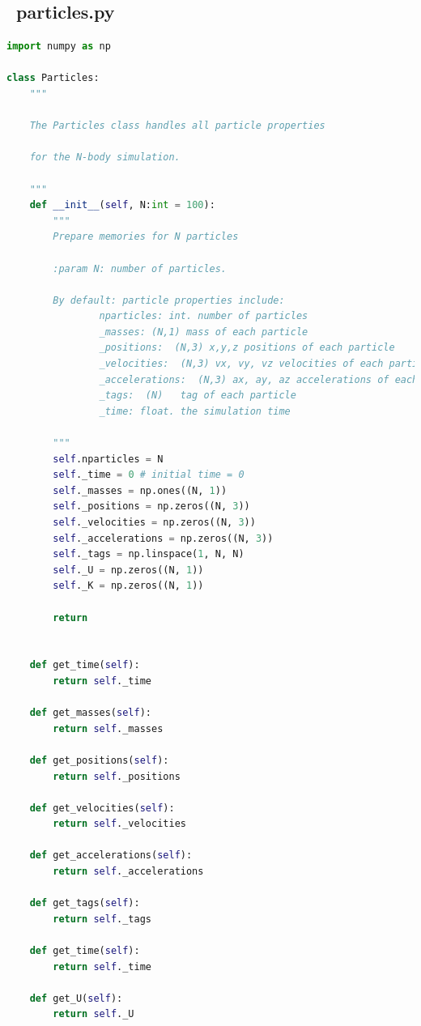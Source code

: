 \documentclass[12pt]{article}
\begin{document}
    \subsection{{\ttfamily\ particles.py}}
        \begin{lstlisting}[language={Python}]
import numpy as np

class Particles:
    """
    
    The Particles class handles all particle properties

    for the N-body simulation. 

    """
    def __init__(self, N:int = 100):
        """
        Prepare memories for N particles

        :param N: number of particles.

        By default: particle properties include:
                nparticles: int. number of particles
                _masses: (N,1) mass of each particle
                _positions:  (N,3) x,y,z positions of each particle
                _velocities:  (N,3) vx, vy, vz velocities of each particle
                _accelerations:  (N,3) ax, ay, az accelerations of each partciel
                _tags:  (N)   tag of each particle
                _time: float. the simulation time 

        """
        self.nparticles = N
        self._time = 0 # initial time = 0
        self._masses = np.ones((N, 1))
        self._positions = np.zeros((N, 3))
        self._velocities = np.zeros((N, 3))
        self._accelerations = np.zeros((N, 3))
        self._tags = np.linspace(1, N, N)
        self._U = np.zeros((N, 1))
        self._K = np.zeros((N, 1))
        
        return


    def get_time(self):
        return self._time
    
    def get_masses(self):
        return self._masses
    
    def get_positions(self):
        return self._positions
    
    def get_velocities(self):
        return self._velocities
    
    def get_accelerations(self):
        return self._accelerations
    
    def get_tags(self):
        return self._tags
    
    def get_time(self):
        return self._time
    
    def get_U(self):
        return self._U
    

\end{lstlisting}
\end{document}
